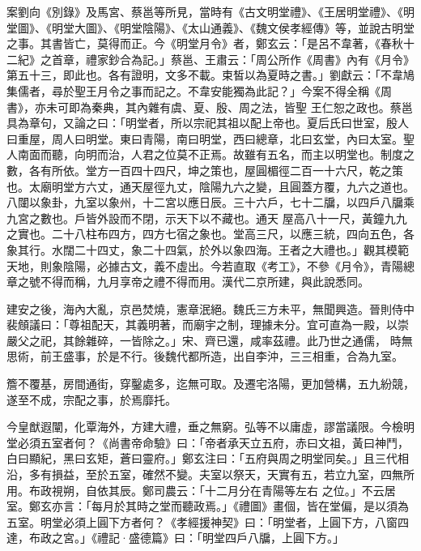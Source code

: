 \begin{pinyinscope}
 案劉向《別錄》及馬宮、蔡邕等所見，當時有《古文明堂禮》、《王居明堂禮》、《明堂圖》、《明堂大圖》、《明堂陰陽》、《太山通義》、《魏文侯孝經傳》等，並說古明堂之事。其書皆亡，莫得而正。今《明堂月令》者，鄭玄云：「是呂不韋著，《春秋十二紀》之首章，禮家鈔合為記。」蔡邕、王肅云：「周公所作《周書》內有《月令》第五十三，即此也。各有證明，文多不載。束皙以為夏時之書。」劉獻云：「不韋鳩集儒者，尋於聖王月令之事而記之。不韋安能獨為此記？」今案不得全稱《周書》，亦未可即為秦典，其內雜有虞、夏、殷、周之法，皆聖
 王仁恕之政也。蔡邕具為章句，又論之曰：「明堂者，所以宗祀其祖以配上帝也。夏后氏曰世室，殷人曰重屋，周人曰明堂。東曰青陽，南曰明堂，西曰總章，北曰玄堂，內曰太室。聖人南面而聽，向明而治，人君之位莫不正焉。故雖有五名，而主以明堂也。制度之數，各有所依。堂方一百四十四尺，坤之策也，屋圓楣徑二百一十六尺，乾之策也。太廟明堂方六丈，通天屋徑九丈，陰陽九六之變，且圓蓋方覆，九六之道也。八闥以象卦，九室以象州，十二宮以應日辰。三十六戶，七十二牖，以四戶八牖乘九宮之數也。戶皆外設而不閉，示天下以不藏也。通天
 屋高八十一尺，黃鐘九九之實也。二十八柱布四方，四方七宿之象也。堂高三尺，以應三統，四向五色，各象其行。水闊二十四丈，象二十四氣，於外以象四海。王者之大禮也。」觀其模範天地，則象陰陽，必據古文，義不虛出。今若直取《考工》，不參《月令》，青陽總章之號不得而稱，九月享帝之禮不得而用。漢代二京所建，與此說悉同。



 建安之後，海內大亂，京邑焚燒，憲章泯絕。魏氏三方未平，無聞興造。晉則侍中裴頠議曰：「尊祖配天，其義明著，而廟宇之制，理據未分。宜可直為一殿，以崇嚴父之祀，其餘雜碎，一皆除之。」宋、齊已還，咸率茲禮。此乃世之通儒，
 時無思術，前王盛事，於是不行。後魏代都所造，出自李沖，三三相重，合為九室。



 簷不覆基，房間通街，穿鑿處多，迄無可取。及遷宅洛陽，更加營構，五九紛競，遂至不成，宗配之事，於焉靡托。



 今皇猷遐闡，化覃海外，方建大禮，垂之無窮。弘等不以庸虛，謬當議限。今檢明堂必須五室者何？《尚書帝命驗》曰：「帝者承天立五府，赤曰文祖，黃曰神鬥，白曰顯紀，黑曰玄矩，蒼曰靈府。」鄭玄注曰：「五府與周之明堂同矣。」且三代相沿，多有損益，至於五室，確然不變。夫室以祭天，天實有五，若立九室，四無所用。布政視朔，自依其辰。鄭司農云：「十二月分在青陽等左右
 之位。」不云居室。鄭玄亦言：「每月於其時之堂而聽政焉。」《禮圖》畫個，皆在堂偏，是以須為五室。明堂必須上圓下方者何？《孝經援神契》曰：「明堂者，上圓下方，八窗四達，布政之宮。」《禮記·盛德篇》曰：「明堂四戶八牖，上圓下方。」




\end{pinyinscope}
